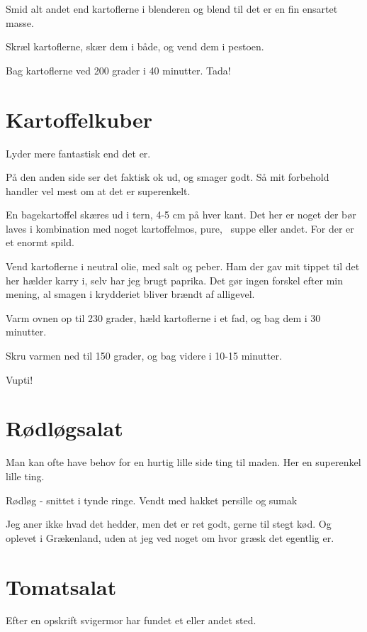 \documentclass[
]{book}
\begin{document}
Smid alt andet end kartoflerne i blenderen og blend til det er en fin ensartet masse.

Skræl kartoflerne, skær dem i både, og vend dem i pestoen.

Bag kartoflerne ved 200 grader i 40 minutter. Tada!

\section{Kartoffelkuber}\label{kartoffelkuber}

Lyder mere fantastisk end det er.

På den anden side ser det faktisk ok ud, og smager godt. Så mit forbehold handler vel mest om at det er superenkelt.

En bagekartoffel skæres ud i tern, 4-5 cm på hver kant. Det her er noget der bør laves i kombination med noget kartoffelmos, pure,~ suppe eller andet. For der er et enormt spild.

Vend kartoflerne i neutral olie, med salt og peber. Ham der gav mit tippet til det her hælder karry i, selv har jeg brugt paprika. Det gør ingen forskel efter min mening, al smagen i krydderiet bliver brændt af alligevel.

Varm ovnen op til 230 grader, hæld kartoflerne i et fad, og bag dem i 30 minutter.

Skru varmen ned til 150 grader, og bag videre i 10-15 minutter.

Vupti!

\section{Rødløgsalat}\label{ruxf8dluxf8gsalat}

Man kan ofte have behov for en hurtig lille side ting til maden. Her en superenkel lille ting.

Rødløg - snittet i tynde ringe.
Vendt med hakket persille og sumak

Jeg aner ikke hvad det hedder, men det er ret godt, gerne til stegt kød. Og oplevet i Grækenland, uden at jeg ved noget om hvor græsk det egentlig er.

\section{Tomatsalat}\label{tomatsalat}

Efter en opskrift svigermor har fundet et eller andet sted.
\end{document}
